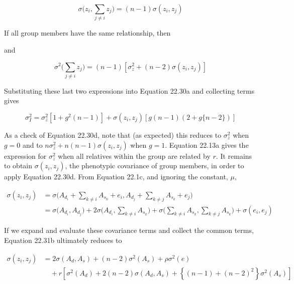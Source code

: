 \documentclass{article}
\begin{document}
\begin{equation}
\sigma\bigg(z_{i},\sum_{j\neq i}z_{j}\bigg)=(n-1)\sigma(z_{i},z_{j})
\tag{22.30b}
\label{eq:22_30b}
\end{equation}

If all group members have the same relationship, then

and

\begin{equation}
\sigma^{2}\Bigg(\sum_{j\neq i}z_{j}\Bigg)=(n-1)\left[\sigma_{z}^{2}+(n-2)\sigma(z_{i},z_{j})\right]
\tag{22.30c}
\label{eq:22_30c}
\end{equation}

Substituting these last two expressions into Equation 22.30a and collecting terms gives

\begin{equation}
\sigma_{I}^{2}=\sigma_{z}^{2}\left[1+g^{2}(n-1)\right]+\sigma(z_{i},z_{j})\left[g(n-1)\left(2+g\{n-2\}\right)\right]
\tag{22.30d}
\label{eq:22_30d}
\end{equation}

As a check of Equation 22.30d, note that (as expected) this reduces to  $ \sigma_z^2 $ when  $ g = 0 $ and to  $ n\sigma_z^2 + n(n - 1)\sigma(z_i, z_j) $ when  $ g = 1 $. Equation 22.13a gives the expression for  $ \sigma_z^2 $ when all relatives within the group are related by  $ r $. It remains to obtain  $ \sigma(z_i, z_j) $, the phenotypic covariance of group members, in order to apply Equation 22.30d. From Equation 22.1c, and ignoring the constant,  $ \mu $,

\begin{equation}
\begin{align*}\sigma(z_{i},z_{j})&=\sigma\Big(A_{d_{i}}+\sum_{k\neq i}A_{s_{k}}+e_{i},A_{d_{j}}+\sum_{k\neq j}A_{s_{k}}+e_{j}\Big)\\&=\sigma\Big(A_{d_{i}},A_{d_{j}}\Big)+2\sigma\Big(A_{d_{i}},\sum_{k\neq i}A_{s_{k}}\Big)+\sigma\Big(\sum_{k\neq i}A_{s_{k}},\sum_{k\neq j}A_{s_{k}}\Big)+\sigma(e_{i},e_{j})\end{align*}
\tag{22.31b}
\label{eq:22_31b}
\end{equation}

If we expand and evaluate these covariance terms and collect the common terms, Equation 22.31b ultimately reduces to

\begin{equation}
\begin{align*}\sigma(z_{i},z_{j})&=2\sigma(A_{d},A_{s})+(n-2)\sigma^{2}(A_{s})+\rho\sigma^{2}(e)\\&\quad+r\left[\sigma^{2}(A_{d})+2(n-2)\sigma(A_{d},A_{s})+\left\{(n-1)+(n-2)^{2}\right\}\sigma^{2}(A_{s})\right]\end{align*}
\tag{22.31c}
\label{eq:22_31c}
\end{equation}
\end{document}
